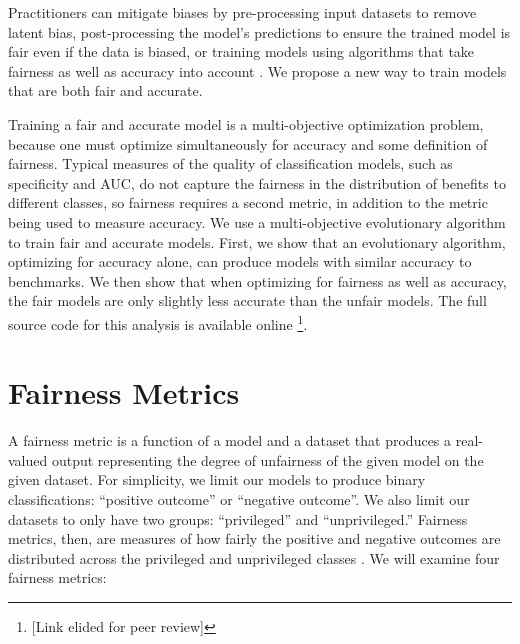 \documentclass[10pt]{acmart}
\begin{document}
Practitioners can mitigate biases by pre-processing input datasets to remove latent bias, post-processing the model’s predictions to ensure the trained model is fair even if the data is biased, or training models using algorithms that take fairness as well as accuracy into account \citep{Angwin:2016}. We propose a new way to train models that are both fair and accurate.

Training a fair and accurate model is a multi-objective optimization problem, because one must optimize simultaneously for accuracy and some definition of fairness. Typical measures of the quality of classification models, such as specificity and AUC, do not capture the fairness in the distribution of benefits to different classes, so fairness requires a second metric, in addition to the metric being used to measure accuracy. We use a multi-objective evolutionary algorithm to train fair and accurate models. First, we show that an evolutionary algorithm, optimizing for accuracy alone, can produce models with similar accuracy to benchmarks. We then show that when optimizing for fairness as well as accuracy, the fair models are only slightly less accurate than the unfair models. The full source code for this analysis is available online \footnote{[Link elided for peer review]}.

\section{Fairness Metrics}
A fairness metric is a function of a model and a dataset that produces a real-valued output representing the degree of unfairness of the given model on the given dataset. For simplicity, we limit our models to produce binary classifications: ``positive outcome'' or ``negative outcome''. We also limit our datasets to only have two groups: ``privileged'' and ``unprivileged.'' Fairness metrics, then, are measures of how fairly the positive and negative outcomes are distributed across the privileged and unprivileged classes \citep{Binns:2017}. We will examine four fairness metrics:
\end{document}
